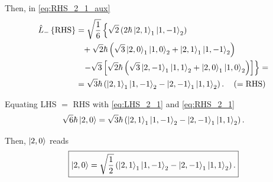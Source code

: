 Then, in \cref{eq:RHS_2_1_aux}
\begin{align}\label{eq:RHS_2_1}
    \notag
    \hat{L}_{-} \left\{ \text{RHS} \right\} &=
        \sqrt{\frac{1}{6}} \left\{
            \sqrt{2}
            \left( 2 \hbar \Ket{2,1}_1 \Ket{1,-1}_2 \right)
            \right.
            \\
            \notag
            & \phantom{=} 
            +
            \sqrt{2} \hbar \left( 
                \sqrt{3} \Ket{2,0}_1 \Ket{1,0}_2
                +
                \Ket{2,1}_1 \Ket{1,-1}_2 
            \right)
            \\
            \notag
            & \phantom{=} 
            \left.
            - \sqrt{3}
            \left[
                \sqrt{2} \hbar \left( 
                    \sqrt{3} \Ket{2,-1}_1 \Ket{1,1}_2
                    +
                    \Ket{2,0}_1 \Ket{1,0}_2
                \right)
            \right]
        \right\}
        = \\
        &=
        \sqrt{3} \hbar \left(
            \Ket{2,1}_1 \Ket{1,-1}_2
            -
            \Ket{2,-1}_1 \Ket{1,1}_2
        \right).
        \quad \left( =\text{RHS} \right)
\end{align}

Equating LHS $=$ RHS with \cref{eq:LHS_2_1} and \cref{eq:RHS_2_1} 
\begin{equation}
    \sqrt{6} \hbar \Ket{2,0} =
    \sqrt{3} \hbar \left(
            \Ket{2,1}_1 \Ket{1,-1}_2
            -
            \Ket{2,-1}_1 \Ket{1,1}_2
        \right).
\end{equation}

Then, $\Ket{2,0}$ reads 
\begin{equation}
    \boxed{
        \Ket{2,0} =
        \sqrt{\frac{1}{2}} \left(
            \Ket{2,1}_1 \Ket{1,-1}_2
            -
            \Ket{2,-1}_1 \Ket{1,1}_2
        \right).
    }
\end{equation}


